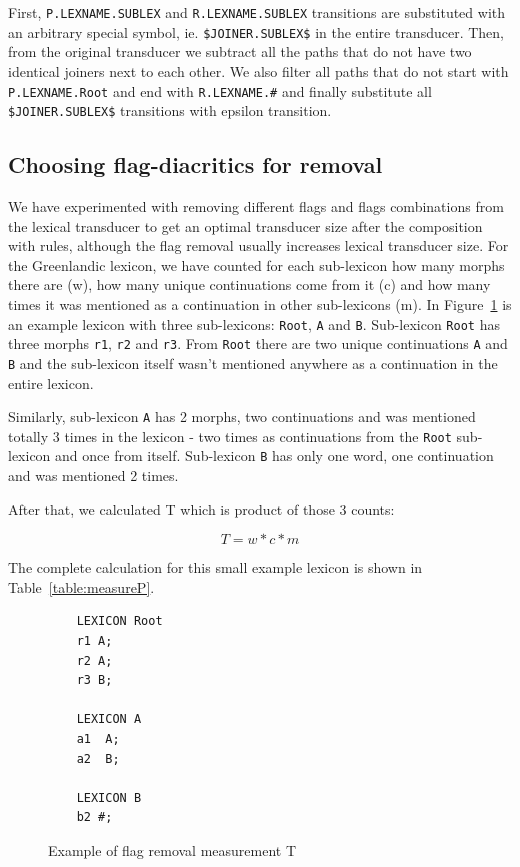 \documentclass[10pt, a4paper]{article}
\begin{document}
First, \verb+P.LEXNAME.SUBLEX+ and \verb+R.LEXNAME.SUBLEX+ transitions are substituted with an arbitrary special symbol, ie. 
\verb+$JOINER.SUBLEX$+ in the entire transducer. 
Then, from the original transducer we subtract all the paths that do not have two identical joiners next to each other. We also filter all paths that 
do not start with \verb+P.LEXNAME.Root+ and end with \verb+R.LEXNAME.#+ and finally substitute all \verb+$JOINER.SUBLEX$+ transitions with epsilon transition.

\subsection{Choosing flag-diacritics for removal}

We have experimented with removing different flags and flags combinations from the lexical transducer 
to get an optimal transducer size after the composition with rules, although the flag removal usually increases lexical transducer size. 
For the Greenlandic lexicon, we have counted 
for each sub-lexicon how many morphs there are (w), how many unique continuations come from it (c) and how many times it 
was mentioned as a continuation in other sub-lexicons (m). In Figure~\ref{fig:lexc-measures} is an example lexicon 
with three sub-lexicons: \verb+Root+, \verb+A+ and \verb+B+. Sub-lexicon \verb+Root+ has three morphs \verb+r1+, \verb+r2+ and \verb+r3+. 
From \verb+Root+ there are two unique continuations \verb+A+ and \verb+B+ and the sub-lexicon itself wasn't mentioned anywhere as a continuation in the entire lexicon.

Similarly, sub-lexicon \verb+A+ has 2 morphs, two continuations and was mentioned totally 3 times in the lexicon - 
two times as continuations from the \verb+Root+ sub-lexicon and once from itself. Sub-lexicon \verb+B+ has only one word, one continuation and was mentioned 2 times. 

After that, we calculated T which is product of 
those 3 counts:

\begin{equation}\label{first}
T = w * c * m
\end{equation}


The complete calculation for this small example lexicon is shown in Table~\ref{table:measureP}.

\begin{figure}
\centering
\begin{verbatim}
    LEXICON Root
    r1 A;
    r2 A;
    r3 B;
    
    LEXICON A
    a1  A;
    a2  B;
    
    LEXICON B
    b2 #;
    \end{verbatim}
  
    \caption{Example of flag removal measurement T
    \label{fig:lexc-measures}}
\end{figure}
\end{document}
